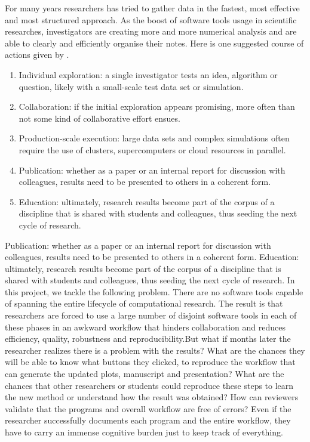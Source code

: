 For many years researchers has tried to gather data in the fastest, most effective and most structured approach. As the boost of software tools usage in scientific researches, investigators are creating more and more numerical analysis and are able to clearly and efficiently organise their notes. Here is one suggested course of actions given by \cite{}.

\begin{enumerate}
\item Individual exploration: a single investigator tests an idea, algorithm or question, likely with a small-scale test data set or simulation.
\item Collaboration: if the initial exploration appears promising, more often than not some kind of collaborative effort ensues.
\item Production-scale execution: large data sets and complex simulations often require the use of clusters, supercomputers or cloud resources in parallel.
\item Publication: whether as a paper or an internal report for discussion with colleagues, results need to be presented to others in a coherent form.
\item Education: ultimately, research results become part of the corpus of a discipline that is shared with students and colleagues, thus seeding the next cycle of research.
\end{enumerate}

 
 
 Publication: whether as a paper or an internal report for discussion with colleagues, results need to be presented to others in a coherent form.
 Education: ultimately, research results become part of the corpus of a discipline that is shared with students and colleagues, thus seeding the next cycle of research.
In this project, we tackle the following problem. There are no software tools capable of spanning the entire lifecycle of computational research. The result is that researchers are forced to use a large number of disjoint software tools in each of these phases in an awkward workflow that hinders collaboration and reduces efficiency, quality, robustness and reproducibility.But what if months later the researcher realizes there is a problem with the results? What are the chances they will be able to know what buttons they clicked, to reproduce the workflow that can generate the updated plots, manuscript and presentation? What are the chances that other researchers or students could reproduce these steps to learn the new method or understand how the result was obtained? How can reviewers validate that the programs and overall workflow are free of errors? Even if the researcher successfully documents each program and the entire workflow, they have to carry an immense cognitive burden just to keep track of everything.



